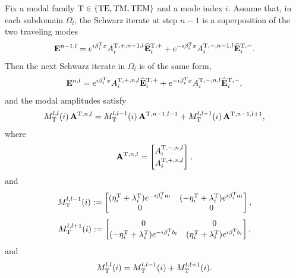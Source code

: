 \documentclass[smallextended]{svjour3}       %
\begin{document}
\begin{proposition}\label{prop:mode-ite}
Fix a modal family ${\rm T}\in\{{\rm TE,TM,TEM}\}$ and a mode index $i$. Assume that, in each subdomain $\Omega_l$, the Schwarz iterate at step $n-1$ is a superposition of the two traveling modes
\[
\mathbf E^{n-1,l}
=
e^{\imath \beta_i^{\rm T}x}A_i^{{\rm T},+,n-1,l}\widehat{\mathbf E}_i^{{\rm T},+}
+
e^{-\imath \beta_i^{\rm T}x}A_i^{{\rm T},-,n-1,l}\widehat{\mathbf E}_i^{{\rm T},-}.
\]
Then the next Schwarz iterate in $\Omega_l$ is of the same form,
\[
\mathbf E^{n,l}
=
e^{\imath \beta_i^{\rm T}x}A_i^{{\rm T},+,n,l}\widehat{\mathbf E}_i^{{\rm T},+}
+
e^{-\imath \beta_i^{\rm T}x}A_i^{{\rm T},-,n,l}\widehat{\mathbf E}_i^{{\rm T},-},
\]
and the modal amplitudes satisfy
\begin{equation}\label{eq:iterT-generic}
M_{\rm T}^{l,l}(i)\,\mathbf A^{{\rm T},n,l}
=
M_{\rm T}^{l,l-1}(i)\,\mathbf A^{{\rm T},n-1,l-1}
+
M_{\rm T}^{l,l+1}(i)\,\mathbf A^{{\rm T},n-1,l+1},
\end{equation}
where
\[
\mathbf A^{{\rm T},n,l}
=
\begin{bmatrix}
A_i^{{\rm T},-,n,l}\\[2pt]
A_i^{{\rm T},+,n,l}
\end{bmatrix},
\]
and
\[
M_{\rm T}^{l,l-1}(i):=
\begin{bmatrix}
(\eta_i^{\rm T}+\lambda_i^{\rm T})e^{-\imath\beta_i^{\rm T}a_l}
&
(-\eta_i^{\rm T}+\lambda_i^{\rm T})e^{\imath\beta_i^{\rm T}a_l}
\\
0 & 0
\end{bmatrix},
\]
\[
M_{\rm T}^{l,l+1}(i):=
\begin{bmatrix}
0 & 0
\\
(-\eta_i^{\rm T}+\lambda_i^{\rm T})e^{-\imath\beta_i^{\rm T}b_l}
&
(\eta_i^{\rm T}+\lambda_i^{\rm T})e^{\imath\beta_i^{\rm T}b_l}
\end{bmatrix},
\]
and
\[
M_{\rm T}^{l,l}(i)=M_{\rm T}^{l,l-1}(i)+M_{\rm T}^{l,l+1}(i).
\]
\end{proposition}
\end{document}
